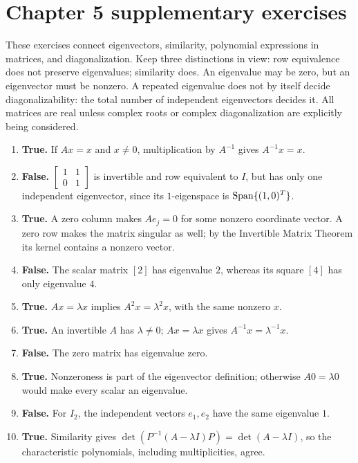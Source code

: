 \section{Chapter 5 supplementary exercises}
These exercises connect eigenvectors, similarity, polynomial expressions
in matrices, and diagonalization. Keep three distinctions in view:
row equivalence does not preserve eigenvalues; similarity does.
An eigenvalue may be zero, but an eigenvector must be nonzero.
A repeated eigenvalue does not by itself decide diagonalizability:
the total number of independent eigenvectors decides it.
All matrices are real unless complex roots or complex diagonalization
are explicitly being considered.

\begin{enumerate}[label=(\alph*)]
\item \textbf{True.} If $Ax=x$ and $x\ne0$, multiplication by
$A^{-1}$ gives $A^{-1}x=x$.
\item \textbf{False.} $\begin{bmatrix}1&1\\0&1\end{bmatrix}$ is
invertible and row equivalent to $I$, but has only one independent
eigenvector, since its $1$-eigenspace is $\operatorname{Span}\{(1,0)^T\}$.
\item \textbf{True.} A zero column makes $Ae_j=0$ for some nonzero
coordinate vector. A zero row makes the matrix singular as well;
by the Invertible Matrix Theorem its kernel contains a nonzero vector.
\item \textbf{False.} The scalar matrix $[2]$ has eigenvalue $2$,
whereas its square $[4]$ has only eigenvalue $4$.
\item \textbf{True.} $Ax=\lambda x$ implies
$A^2x=\lambda^2x$, with the same nonzero $x$.
\item \textbf{True.} An invertible $A$ has $\lambda\ne0$;
$Ax=\lambda x$ gives $A^{-1}x=\lambda^{-1}x$.
\item \textbf{False.} The zero matrix has eigenvalue zero.
\item \textbf{True.} Nonzeroness is part of the eigenvector definition;
otherwise $A0=\lambda0$ would make every scalar an eigenvalue.
\item \textbf{False.} For $I_2$, the independent vectors $e_1,e_2$
have the same eigenvalue $1$.
\item \textbf{True.} Similarity gives
$\det(P^{-1}(A-\lambda I)P)=\det(A-\lambda I)$, so the
characteristic polynomials, including multiplicities, agree.

\end{enumerate}
